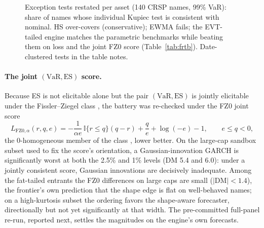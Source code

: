 \documentclass[11pt]{article}
\newcommand{\VaR}{\mathrm{VaR}}
\newcommand{\ES}{\mathrm{ES}}
\theoremstyle{remark}
\begin{document}
\begin{figure}[t]
\centering
{}
\caption{Exception tests restated per asset (140 CRSP names, 99\% VaR):
share of names whose individual Kupiec test is consistent with nominal.
HS over-covers (conservative); EWMA fails; the EVT-tailed engine matches
the parametric benchmarks while beating them on loss and the joint
FZ0 score
(Table~\ref{tab:frtb}). Date-clustered tests in the table notes.}
\label{fig:passrates}
\end{figure}

\paragraph{The joint $(\VaR,\ES)$ score.} Because ES is not elicitable
alone but the pair $(\VaR,\ES)$ is jointly elicitable under the
Fissler--Ziegel class \citep{fissler2016}, the battery was re-checked
under the FZ0 joint score
\begin{equation}
L_{\mathrm{FZ0},\alpha}(r,q,e)=-\frac{1}{\alpha e}\,\mathbb{I}\{r\le q\}(q-r)
+\frac{q}{e}+\log(-e)-1,\qquad e\le q<0,
\label{eq:fz0}
\end{equation}
the $0$-homogeneous member of the class \citep{patton2019}, lower better. On the
large-cap sandbox subset used to fix the score's orientation, a
Gaussian-innovation GARCH is significantly worst at both the 2.5\% and 1\%
levels (DM 5.4 and 6.0): under a jointly consistent score, Gaussian innovations
are decisively inadequate. Among the fat-tailed entrants the FZ0 differences on
large caps are small ($|$DM$|<1.4$), the frontier's own prediction that the
shape edge is flat on well-behaved names; on a high-kurtosis subset the ordering
favors the shape-aware forecaster, directionally but not yet significantly at
that width. The pre-committed full-panel re-run, reported next, settles the
magnitudes on the engine's own forecasts.
\end{document}
